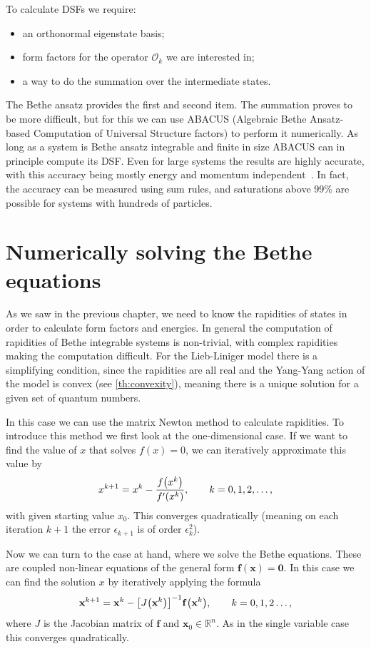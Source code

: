 \documentclass[11pt, a4paper]{report} %
\begin{document}
To calculate DSFs we require:
\begin{itemize}
  \item an orthonormal eigenstate basis;
  \item form factors for the operator $\mathcal{O}_k$ we are interested in;
  \item a way to do the summation over the intermediate states.
\end{itemize}
The Bethe ansatz provides the first and second item.
The summation proves to be more difficult, but for this we can use ABACUS (Algebraic Bethe Ansatz-based Computation of Universal Structure factors) to perform it numerically.
As long as a system is Bethe ansatz integrable and finite in size ABACUS can in principle compute its DSF.\@
Even for large systems the results are highly accurate, with this accuracy being mostly energy and momentum independent~\cite{Caux2009}.
In fact, the accuracy can be measured using sum rules, and saturations above 99\% are possible for systems with hundreds of particles.


\section{Numerically solving the Bethe equations}\label{sec:numer-solv-bethe}

As we saw in the previous chapter, we need to know the rapidities of states in order to calculate form factors and energies.
In general the computation of rapidities of Bethe integrable systems is non-trivial, with complex rapidities making the computation difficult.
For the Lieb-Liniger model there is a simplifying condition, since the rapidities are all real and the Yang-Yang action of the model is convex (see \cref{th:convexity}), meaning there is a unique solution for a given set of quantum numbers.

In this case we can use the matrix Newton method to calculate rapidities.
To introduce this method we first look at the one-dimensional case.
If we want to find the value of \(x\) that solves \(f(x)=0\), we can iteratively approximate this value by 
\begin{equation}
  x^{k+1} = x^k - \frac{f\qty(x^k)}{f'\qty(x^k)}, \qquad k = 0, 1, 2, \ldots,
\end{equation}
with given starting value \(x_0\).
This converges quadratically (meaning on each iteration \(k+1\) the error \(\epsilon_{k+1}\) is of order \(\epsilon_k^2\)).

Now we can turn to the case at hand, where we solve the Bethe equations.
These are coupled non-linear equations of the general form \(\mathbf{f(x)=0}\).
In this case we can find the solution \(x\) by iteratively applying the formula
\begin{equation}
  \mathbf{x}^{k+1} = \mathbf{x}^k - {\qty[J\qty(\mathbf{x}^k)]}^{-1}\mathbf{f}\qty(\mathbf{x}^k), \qquad k=0,1,2\ldots,
\end{equation}
where \(J\) is the Jacobian matrix of \(\mathbf{f}\) and \(\mathbf{x}_0 \in \mathbb{R}^n\).
As in the single variable case this converges quadratically.
\end{document}
